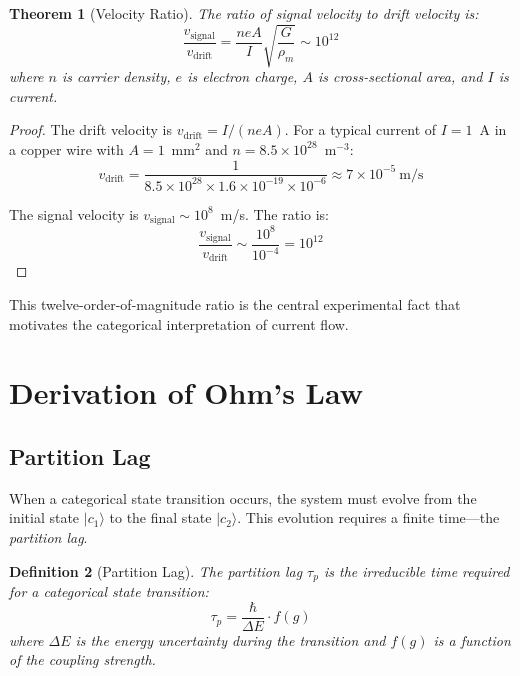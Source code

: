 \documentclass[twocolumn,showpacs,preprintnumbers,amsmath,amssymb,prd]{revtex4-2}
\newtheorem{theorem}{Theorem}[section]
\newtheorem{definition}[theorem]{Definition}
\newcommand{\taup}{\tau_p}
\begin{document}
\begin{theorem}[Velocity Ratio]
\label{thm:velocity_ratio}
The ratio of signal velocity to drift velocity is:
\begin{equation}
\frac{v_{\text{signal}}}{v_{\text{drift}}} = \frac{n e A}{I} \sqrt{\frac{G}{\rho_m}} \sim 10^{12}
\label{eq:velocity_ratio}
\end{equation}
where $n$ is carrier density, $e$ is electron charge, $A$ is cross-sectional area, and $I$ is current.
\end{theorem}

\begin{proof}
The drift velocity is $v_{\text{drift}} = I/(neA)$. For a typical current of $I = 1$~A in a copper wire with $A = 1$~mm$^2$ and $n = 8.5 \times 10^{28}$~m$^{-3}$:
\begin{equation}
v_{\text{drift}} = \frac{1}{8.5 \times 10^{28} \times 1.6 \times 10^{-19} \times 10^{-6}} \approx 7 \times 10^{-5}~\text{m/s}
\end{equation}

The signal velocity is $v_{\text{signal}} \sim 10^8$~m/s. The ratio is:
\begin{equation}
\frac{v_{\text{signal}}}{v_{\text{drift}}} \sim \frac{10^8}{10^{-4}} = 10^{12}
\end{equation}
\end{proof}

This twelve-order-of-magnitude ratio is the central experimental fact that motivates the categorical interpretation of current flow.


\section{Derivation of Ohm's Law}
\label{sec:ohm}

\subsection{Partition Lag}

When a categorical state transition occurs, the system must evolve from the initial state $|c_1\rangle$ to the final state $|c_2\rangle$. This evolution requires a finite time---the \emph{partition lag}.

\begin{definition}[Partition Lag]
\label{def:partition_lag}
The partition lag $\taup$ is the irreducible time required for a categorical state transition:
\begin{equation}
\taup = \frac{\hbar}{\Delta E} \cdot f(g)
\label{eq:partition_lag}
\end{equation}
where $\Delta E$ is the energy uncertainty during the transition and $f(g)$ is a function of the coupling strength.
\end{definition}
\end{document}
